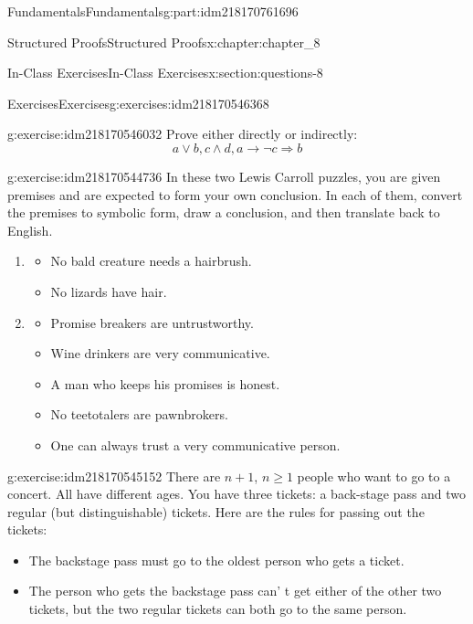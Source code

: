 \documentclass[oneside,10pt,]{book}
\numberwithin{equation}{section}
\begin{document}
\begin{partptx}{Fundamentals}{}{Fundamentals}{}{}{g:part:idm218170761696}
\begin{chapterptx}{Structured Proofs}{}{Structured Proofs}{}{}{x:chapter:chapter_8}
\begin{sectionptx}{In-Class Exercises}{}{In-Class Exercises}{}{}{x:section:questions-8}
\begin{exercises-subsection-numberless}{Exercises}{}{Exercises}{}{}{g:exercises:idm218170546368}
\begin{exercisegroup}
\begin{divisionexerciseeg}{1}{}{}{g:exercise:idm218170546032}%
Prove either directly or indirectly:%
\begin{equation*}
a \lor  b, c \land  d, a \rightarrow  \neg c \Rightarrow  b
\end{equation*}
%
\end{divisionexerciseeg}%
\begin{divisionexerciseeg}{2}{}{}{g:exercise:idm218170544736}%
In these two Lewis Carroll puzzles, you are given premises and are expected to form your own conclusion.  In each of them, convert the premises to symbolic form, draw a conclusion, and then translate back to English.%
\begin{enumerate}[label=(\alph*)]
\item{}%
\begin{itemize}[label=\textbullet]
\item{}No bald creature needs a hairbrush.%
\item{}No lizards have hair.%
\end{itemize}
%
\item{}%
\begin{itemize}[label=\textbullet]
\item{}Promise breakers are untrustworthy.%
\item{}Wine drinkers are very communicative.%
\item{}A man who keeps his promises is honest.%
\item{}No teetotalers are pawnbrokers.%
\item{}One can always trust a very communicative person.%
\end{itemize}
%
\end{enumerate}
%
\end{divisionexerciseeg}%
\begin{divisionexerciseeg}{3}{}{}{g:exercise:idm218170545152}%
There are \(n+1\), \(n\ge 1\) people who want to go to a concert.  All have different ages. You have three tickets: a back-stage pass and two regular (but distinguishable) tickets. Here are the rules for passing out the tickets:%
\begin{itemize}[label=\textbullet]
\item{}The backstage pass must go to the oldest person who gets a ticket.%
\item{}The person who gets the backstage pass can' t get either of the other two tickets, but the two regular tickets can both go to the same person.%
\end{itemize}

\end{divisionexerciseeg}
\end{exercisegroup}
\end{exercises-subsection-numberless}
\end{sectionptx}
\end{chapterptx}
\end{partptx}
\end{document}
